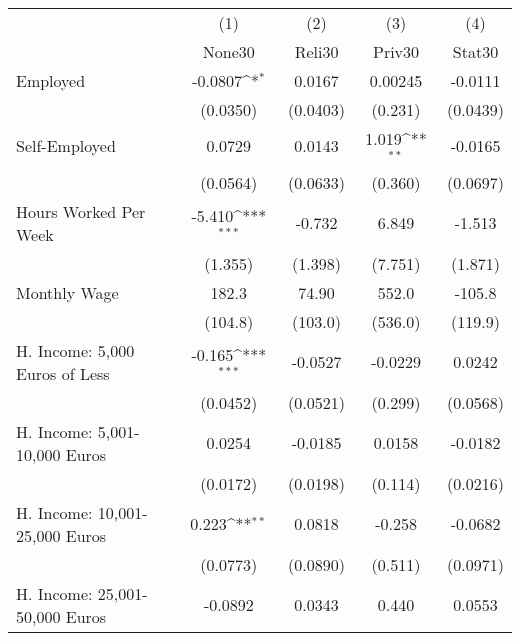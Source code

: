 {
\def\sym#1{\ifmmode^{#1}\else\(^{#1}\)\fi}
\begin{tabular}{l*{4}{c}}
\hline\hline
            &\multicolumn{1}{c}{(1)}&\multicolumn{1}{c}{(2)}&\multicolumn{1}{c}{(3)}&\multicolumn{1}{c}{(4)}\\
            &\multicolumn{1}{c}{None30}&\multicolumn{1}{c}{Reli30}&\multicolumn{1}{c}{Priv30}&\multicolumn{1}{c}{Stat30}\\
\hline
Employed    &     -0.0807\sym{*}  &      0.0167         &     0.00245         &     -0.0111         \\
            &    (0.0350)         &    (0.0403)         &     (0.231)         &    (0.0439)         \\
[1em]
Self-Employed&      0.0729         &      0.0143         &       1.019\sym{**} &     -0.0165         \\
            &    (0.0564)         &    (0.0633)         &     (0.360)         &    (0.0697)         \\
[1em]
Hours Worked Per Week&      -5.410\sym{***}&      -0.732         &       6.849         &      -1.513         \\
            &     (1.355)         &     (1.398)         &     (7.751)         &     (1.871)         \\
[1em]
Monthly Wage&       182.3         &       74.90         &       552.0         &      -105.8         \\
            &     (104.8)         &     (103.0)         &     (536.0)         &     (119.9)         \\
[1em]
H. Income: 5,000 Euros of Less&      -0.165\sym{***}&     -0.0527         &     -0.0229         &      0.0242         \\
            &    (0.0452)         &    (0.0521)         &     (0.299)         &    (0.0568)         \\
[1em]
H. Income: 5,001-10,000 Euros&      0.0254         &     -0.0185         &      0.0158         &     -0.0182         \\
            &    (0.0172)         &    (0.0198)         &     (0.114)         &    (0.0216)         \\
[1em]
H. Income: 10,001-25,000 Euros&       0.223\sym{**} &      0.0818         &      -0.258         &     -0.0682         \\
            &    (0.0773)         &    (0.0890)         &     (0.511)         &    (0.0971)         \\
[1em]
H. Income: 25,001-50,000 Euros&     -0.0892         &      0.0343         &       0.440         &      0.0553         \\

\end{tabular}}
